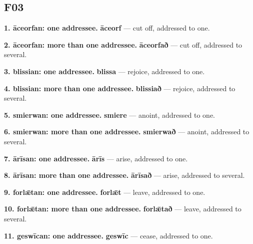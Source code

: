 \subsection*{F03}

\textbf{1. āceorfan: one addressee.} \textbf{āceorf} — cut off, addressed to one.

\textbf{2. āceorfan: more than one addressee.} \textbf{āceorfað} — cut off, addressed to several.

\textbf{3. blissian: one addressee.} \textbf{blissa} — rejoice, addressed to one.

\textbf{4. blissian: more than one addressee.} \textbf{blissiað} — rejoice, addressed to several.

\textbf{5. smierwan: one addressee.} \textbf{smiere} — anoint, addressed to one.

\textbf{6. smierwan: more than one addressee.} \textbf{smierwað} — anoint, addressed to several.

\textbf{7. ārīsan: one addressee.} \textbf{ārīs} — arise, addressed to one.

\textbf{8. ārīsan: more than one addressee.} \textbf{ārīsað} — arise, addressed to several.

\textbf{9. forlǣtan: one addressee.} \textbf{forlǣt} — leave, addressed to one.

\textbf{10. forlǣtan: more than one addressee.} \textbf{forlǣtað} — leave, addressed to several.

\textbf{11. geswīcan: one addressee.} \textbf{geswīc} — cease, addressed to one.

